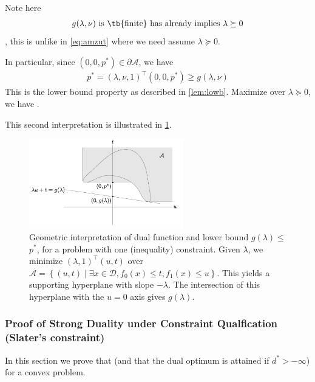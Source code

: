 \documentclass{article}
\begin{document}
Note here  \begin{align}
    g(\lambda, \nu)\text{ is \tb{finite} has already implies } \lambda \succeq 0 \label{eq:iyhir}
\end{align}, this is unlike in \cref{eq:amzut} where we need  assume $\lambda \succeq 0$.


In particular, since $\left(0,0, p^* \right) \in \partial \mathcal{A}$, we have
\begin{align}
p^* =(\lambda, \nu, 1)^{\top}\left(0,0, p^* \right) \geq g(\lambda, \nu)\label{eq:oiije}
\end{align}
This is the lower bound property as described in \cref{lem:lowb}. Maximize over $\lambda\succeq 0$, we have .




This second interpretation is illustrated in \cref{fig:fgnc}.

\begin{figure}
    \centering
    \includegraphics[width=0.6\textwidth]{Figs/11.png}
    \caption{Geometric interpretation of dual function and lower bound $g(\lambda) \leq$ $p^* $, for a problem with one (inequality) constraint. Given $\lambda$, we minimize $(\lambda, 1)^{\top}(u, t)$ over $\mathcal{A}=\left\{(u, t) \mid \exists x \in \mathcal{D}, f_{0}(x) \leq t, f_{1}(x) \leq u\right\} .$ This yields a supporting hyperplane with slope $-\lambda$. The intersection of this hyperplane with the $u=0$ axis gives $g(\lambda)$.}
    \label{fig:fgnc}
\end{figure}
\subsubsection{Proof of Strong Duality under Constraint Qualfication (Slater's constraint)}\label{sec:prfhy}
In this section we prove that  (and that the dual optimum is attained if $d^*>-\infty$) for a convex problem. 
\end{document}
